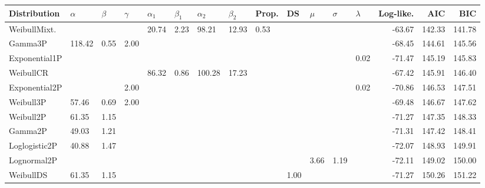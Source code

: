 \documentclass[a4, 11pt]{article}
\theoremstyle{definition}
\theoremstyle{remark}
\begin{document}
   \begin{table}[H]
       \tiny
       \centering
       \begin{tabular}{|l|l|l|l|l|l|l|l|l|l|l|l|l|r|r|r|}
           \hline
           \textbf{Distribution} &
           $\alpha$ &
           $\beta$ &
           $\gamma$ &
           $\alpha_1$ &
           $\beta_1$ &
           $\alpha_2$ &
           $\beta_2$ &
           Prop.&
           DS &
           $\mu$ &
           $\sigma$ &
           $\lambda$ &
           \textbf{Log-like.} &
           \textbf{AIC} &
           \textbf{BIC} \\ \hline
           WeibullMixt. &        &      &      & 20.74 & 2.23 & 98.21  & 12.93 & 0.53 &      &       &       &      & -63.67 & 142.33 & 141.78 \\ \hline
           Gamma3P        & 118.42 & 0.55 & 2.00 &       &      &        &       &      &      &       &       &      & -68.45 & 144.61 & 145.56 \\ \hline
           Exponential1P  &        &      &      &       &      &        &       &      &      &       &       & 0.02 & -71.47 & 145.19 & 145.83 \\ \hline
           WeibullCR      &        &      &      & 86.32 & 0.86 & 100.28 & 17.23 &      &      &       &       &      & -67.42 & 145.91 & 146.40 \\ \hline
           Exponential2P  &        &      & 2.00 &       &      &        &       &      &      &       &       & 0.02 & -70.86 & 146.53 & 147.51 \\ \hline
           Weibull3P      & 57.46  & 0.69 & 2.00 &       &      &        &       &      &      &       &       &      & -69.48 & 146.67 & 147.62 \\ \hline
           Weibull2P      & 61.35  & 1.15 &      &       &      &        &       &      &      &       &       &      & -71.27 & 147.35 & 148.33 \\ \hline
           Gamma2P        & 49.03  & 1.21 &      &       &      &        &       &      &      &       &       &      & -71.31 & 147.42 & 148.41 \\ \hline
           Loglogistic2P  & 40.88  & 1.47 &      &       &      &        &       &      &      &       &       &      & -72.07 & 148.93 & 149.91 \\ \hline
           Lognormal2P    &        &      &      &       &      &        &       &      &      & 3.66  & 1.19  &      & -72.11 & 149.02 & 150.00 \\ \hline
           WeibullDS      & 61.35  & 1.15 &      &       &      &        &       &      & 1.00 &       &       &      & -71.27 & 150.26 & 151.22 \\ \hline

\end{tabular}
\end{table}
\end{document}
